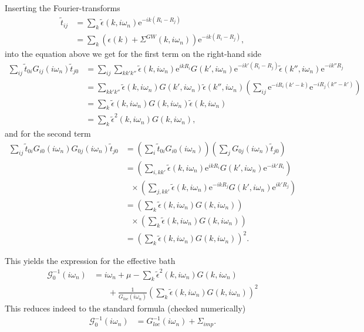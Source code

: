 \documentclass[12pt,a4paper]{scrartcl}
\numberwithin{equation}{section}
\begin{document}
Inserting the Fourier-transforms 
\begin{align}
 \tilde{t}_{ij} 
 &= \sum_k \tilde{ \epsilon}(k,i\omega_n)  \mathrm{e}^{-ik(R_i-R_j)} \\
 &= \sum_k \left( \epsilon(k) + \Sigma^{GW}(k,i\omega_n) \right) \mathrm{e}^{-ik(R_i-R_j)} ,
\end{align}
into the equation above we get for the first term on the right-hand side
\begin{align}
 \sum_{ij} \tilde{t}_{0i} G_{ij}(i\omega_n)\tilde{t}_{j0}
 &= \sum_{ij} \sum_{kk'k''} 
            \tilde{ \epsilon}(k,i\omega_n)\mathrm{e}^{ikR_i}
            G(k',i\omega_n) \mathrm{e}^{-ik'(R_i-R_j)}
            \tilde{ \epsilon}(k'',i\omega_n) \mathrm{e}^{-ik''R_j} \\
%
&=  \sum_{kk'k''} 
            \tilde{ \epsilon}(k,i\omega_n)
            G(k',i\omega_n) 
            \tilde{ \epsilon}(k'',i\omega_n)
            \left( \sum_{ij} \mathrm{e}^{-iR_i(k'-k)}\mathrm{e}^{-iR_j(k''-k')} \right) \\
%
&=  \sum_{k} 
            \tilde{ \epsilon}(k,i\omega_n)
            G(k,i\omega_n) 
            \tilde{ \epsilon}(k,i\omega_n) \\
%
&=  \sum_{k} 
            \tilde{ \epsilon}^2(k,i\omega_n)
            G(k,i\omega_n) , 
\end{align}
and for the second term
\begin{align}
 \sum_{ij} \tilde{t}_{0i} G_{i0}(i\omega_n)G_{0j}(i\omega_n) \tilde{t}_{j0} 
 &= \left( \sum_i \tilde{t}_{0i} G_{i0}(i\omega_n) \right)\left( \sum_j  G_{0j}(i\omega_n) \tilde{t}_{j0} \right) \\
%
 &= \left( \sum_{i,kk'} \tilde{ \epsilon}(k,i\omega_n)\mathrm{e}^{ikR_i} G(k',i\omega_n) \mathrm{e}^{-ik'R_i} \right) \nonumber\\
   & \ \ \ \times \left( \sum_{j,kk'} \tilde{ \epsilon}(k,i\omega_n)\mathrm{e}^{-ikR_j} G(k',i\omega_n) \mathrm{e}^{ik'R_j} \right) \\
%
&= \left( \sum_{k} \tilde{ \epsilon}(k,i\omega_n) G(k,i\omega_n) \right) \nonumber\\
   & \ \ \ \times \left( \sum_{k} \tilde{ \epsilon}(k,i\omega_n) G(k,i\omega_n)  \right) \\
%
&=\left( \sum_{k} \tilde{ \epsilon}(k,i\omega_n) G(k,i\omega_n) \right)^2.
%
\end{align}

This yields the expression for the effective bath
\begin{align}
 \mathcal{G}_0^{-1}(i\omega_n)
 &= i\omega_n + \mu 
   - \sum_{k} \tilde{ \epsilon}^2(k,i\omega_n) G(k,i\omega_n) \nonumber \\
 & \ \ \ \ \ \ \ \ +\frac{1}{G_{loc}(i\omega_n)}\left( \sum_{k} \tilde{ \epsilon}(k,i\omega_n) G(k,i\omega_n) \right)^2
\end{align}
This reduces indeed to the standard formula (checked numerically)
\begin{align}
 \mathcal{G}_0^{-1}(i\omega_n)
 &= G_{loc}^{-1}(i\omega_n) + \Sigma_{imp}.
\end{align}
\end{document}

